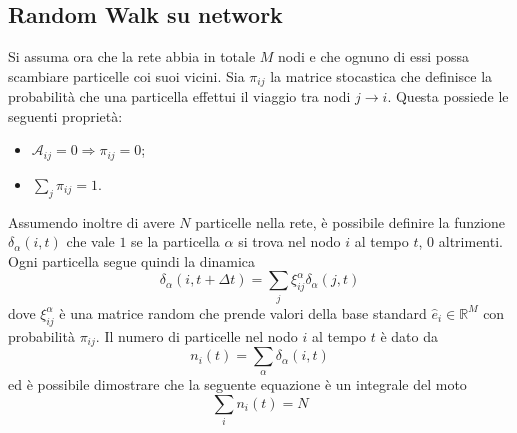 \subsection{Random Walk su network}
Si assuma ora che la rete abbia in totale $M$ nodi e che ognuno di essi possa scambiare particelle coi suoi vicini.
Sia $\pi_{ij}$ la matrice stocastica che definisce la probabilità che una particella effettui il viaggio tra nodi $j\to i$.
Questa possiede le seguenti proprietà:
\begin{itemize}
    \item $\mathcal{A}_{ij}=0 \Longrightarrow \pi_{ij}=0$;
    \item $\sum_j\pi_{ij}=1$.
\end{itemize}
Assumendo inoltre di avere $N$ particelle nella rete, \`e possibile definire la funzione $\delta_\alpha(i,t)$ che vale $1$ se la particella $\alpha$ si trova nel nodo $i$ al tempo $t$, 0 altrimenti.
\\Ogni particella segue quindi la dinamica
\begin{equation*}
    \delta_\alpha(i,t+\Delta t)=\sum_j\xi_{ij}^\alpha\delta_\alpha(j,t)
\end{equation*}
dove $\xi_{ij}^\alpha$ \`e una matrice random che prende valori della base standard $\widehat{e}_i\in \mathbb{R}^M$ con probabilità $\pi_{ij}$.
Il numero di particelle nel nodo $i$ al tempo $t$ \`e dato da
\begin{equation*}
    n_i(t)=\sum_\alpha\delta_\alpha(i,t)
\end{equation*}
ed \`e possibile dimostrare \cite{RandomWalks} che la seguente equazione \`e un integrale del moto
\begin{equation}
    \sum_in_i(t)=N
\end{equation}